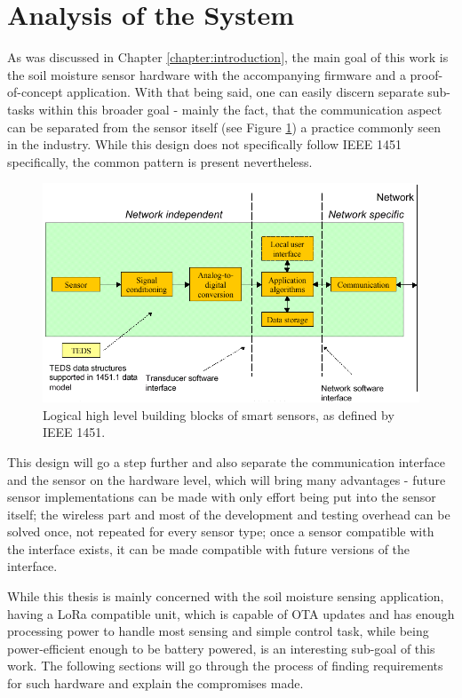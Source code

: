 
\section{Analysis of the System}
As was discussed in Chapter \ref{chapter:introduction}, the main goal of this work is the soil moisture sensor hardware with the accompanying firmware and a proof-of-concept application. With that being said, one can easily discern separate sub-tasks within this broader goal - mainly the fact, that the communication aspect can be separated from the sensor itself (see Figure \ref{fig:device-split}) a practice commonly seen in the industry. While this design does not specifically follow IEEE 1451 \cite{mark_ieee_nodate} specifically, the common pattern is present nevertheless.

\begin{figure}
    \includegraphics[width=\textwidth]{fig/ieee-1451.png}
    \caption{\label{fig:device-split}Logical high level building blocks of smart sensors, as defined by IEEE 1451.}
\end{figure}

This design will go a step further and also separate the communication interface and the sensor on the hardware level, which will bring many advantages - future sensor implementations can be made with only effort being put into the sensor itself; the wireless part and most of the development and testing overhead can be solved once, not repeated for every sensor type; once a sensor compatible with the interface exists, it can be made compatible with future versions of the interface.

While this thesis is mainly concerned with the soil moisture sensing application, having a LoRa compatible unit, which is capable of OTA updates and has enough processing power to handle most sensing and simple control task, while being power-efficient enough to be battery powered, is an interesting sub-goal of this work. The following sections will go through the process of finding requirements for such hardware and explain the compromises made.

